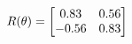 \documentclass[preview]{standalone}
\begin{document}
\begin{align*}
\special{dvisvgm:raw <g id='unique000'>}R(\theta) = \begin{bmatrix}0.83 & 0.56\\-0.56 & 0.83\end{bmatrix}\special{dvisvgm:raw </g>}
\end{align*}
\end{document}

